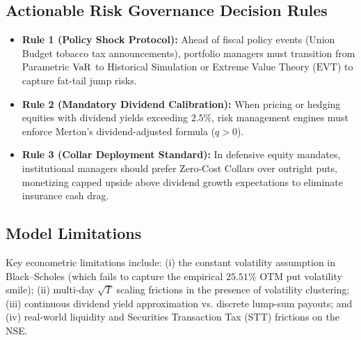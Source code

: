 \subsection{Actionable Risk Governance Decision Rules}
\begin{itemize}[leftmargin=1.8em, noitemsep]
    \item \textbf{Rule 1 (Policy Shock Protocol):} Ahead of fiscal policy events (Union Budget tobacco tax announcements), portfolio managers must transition from Parametric $\operatorname{VaR}$ to Historical Simulation or Extreme Value Theory ($\text{EVT}$) to capture fat-tail jump risks.
    \item \textbf{Rule 2 (Mandatory Dividend Calibration):} When pricing or hedging equities with dividend yields exceeding $2.5\%$, risk management engines must enforce Merton's dividend-adjusted formula ($q > 0$).
    \item \textbf{Rule 3 (Collar Deployment Standard):} In defensive equity mandates, institutional managers should prefer Zero-Cost Collars over outright puts, monetizing capped upside above dividend growth expectations to eliminate insurance cash drag.
\end{itemize}

\subsection{Model Limitations}
Key econometric limitations include: (i) the constant volatility assumption in Black--Scholes (which fails to capture the empirical $25.51\%$ OTM put volatility smile); (ii) multi-day $\sqrt{T}$ scaling frictions in the presence of volatility clustering; (iii) continuous dividend yield approximation vs. discrete lump-sum payouts; and (iv) real-world liquidity and Securities Transaction Tax (STT) frictions on the NSE.
